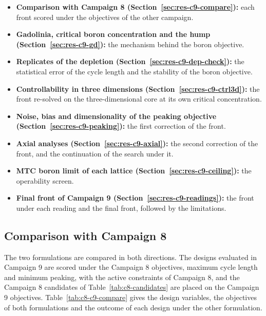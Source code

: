 \begin{itemize}
  \item \textbf{Comparison with Campaign 8
        (Section~\ref{sec:res-c9-compare}):} each front scored under the
        objectives of the other campaign.

  \item \textbf{Gadolinia, critical boron concentration and the hump
        (Section~\ref{sec:res-c9-gd}):} the mechanism behind the boron
        objective.

  \item \textbf{Replicates of the depletion
        (Section~\ref{sec:res-c9-dep-check}):} the statistical error of
        the cycle length and the stability of the boron objective.

  \item \textbf{Controllability in three dimensions
        (Section~\ref{sec:res-c9-ctrl3d}):} the front re-solved on the
        three-dimensional core at its own critical concentration.

  \item \textbf{Noise, bias and dimensionality of the peaking
        objective
        (Section~\ref{sec:res-c9-peaking}):} the first correction of
        the front.

  \item \textbf{Axial analyses
        (Section~\ref{sec:res-c9-axial}):} the second correction of the
        front, and the continuation of the search under it.

  \item \textbf{MTC boron limit of each lattice
        (Section~\ref{sec:res-c9-ceiling}):} the operability screen.

  \item \textbf{Final front of Campaign 9
        (Section~\ref{sec:res-c9-readings}):} the front under each
        reading and the final front, followed by the limitations.
\end{itemize}

\subsection{Comparison with Campaign 8}
\label{sec:res-c9-discarded}
\label{sec:res-c9-compare}

The two formulations are compared in both directions. The designs evaluated in Campaign 9 are scored under the Campaign 8 objectives, maximum cycle length
and minimum peaking, with the active constraints of Campaign 8, and the
Campaign 8 candidates of Table~\ref{tab:c8-candidates} are placed on
the Campaign 9 objectives. Table~\ref{tab:c8-c9-compare} gives the
design variables, the objectives of both formulations and the outcome
of each design under the other formulation.

